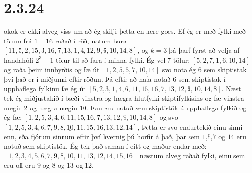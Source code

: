 \documentclass{article}
\begin{document}
\section*{2.3.24}
okok er ekki alveg viss um að ég skilji þetta en here goes.
Ef ég er með fylki með tölum frá $1-16$ raðað í röð, notum bara $[11,5,2,15,3,16,7,13,1,4,12,9,6,10,14,8]$, 
og $k=3$ þá þarf fyrst að velja af handahófi $2^3-1$ tölur til að fara í minna fylki.
Ég vel $7$ tölur: $[5,2,7,1,6,10,14]$ og raða þeim innbyrðis og fæ út $[1,2,5,6,7,10,14]$ svo nota ég $6$ sem skiptistak því það er í miðjunni eftir röðun.
Þá eftir að hafa notað $6$ sem skiptistak í upphaflega fylkinu fæ ég út $[5,2,3,1,4,\underline{6},11,15,16,7,13,12,9,10,14,8]$.
Næst tek ég miðjustakið í bæði vinstra og hægra hlutfylki skiptifylkisins og fæ vinstra megin $2$ og hægra megin $10$. 
Þau eru notuð sem skiptistök á upphaflega fylkið og ég fæ: $[1,\underline{2},5,3,4,6,11,15,16,7,13,12,9,10,14,8]$ og svo $[1,2,5,3,4,6,7,9,8,\underline{10},11,15,16,13,12,14]$,
Þetta er svo endurtekið einu sinni enn, eða fjórum sinnum eftir því hvernig þú horfir á það, þar sem $1$,$5$,$7$ og $14$ eru notuð sem skiptistök. 
Ég tek það saman í eitt og maður endar með: $[1,2,3,4,5,6,7,9,8,10,11,13,12,14,15,16]$ næstum alveg raðað fylki, einu sem eru off eru 9 og 8 og 13 og 12.
\end{document}
